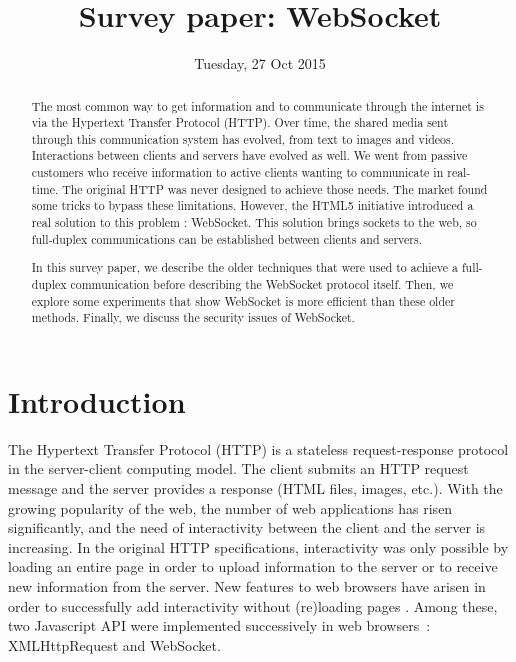 \documentclass[journal,compsoc]{IEEEtran}
\newcommand{\ws}{WebSocket}
\begin{document}
\author{}

\title{Survey paper: \ws}

\date{Tuesday, 27 Oct 2015}

\maketitle
\IEEEpeerreviewmaketitle



\begin{abstract}
The most common way to get information and to communicate through the internet is via the Hypertext Transfer Protocol (HTTP).
Over time, the shared media sent through this communication system has evolved, from text to images and videos.
Interactions between clients and servers have evolved as well.
We went from passive customers who receive information to active clients wanting to communicate in real-time.
The original HTTP was never designed to achieve those needs.
The market found some tricks to bypass these limitations.
However, the HTML5 initiative introduced a real solution to this problem : \ws{}.
This solution brings sockets to the web, so full-duplex communications can be established between clients and servers.

In this survey paper, we describe the older techniques that were used to achieve a full-duplex communication before describing the \ws{} protocol itself.
Then, we explore some experiments that show \ws{} is more efficient than these older methods.
Finally, we discuss the security issues of \ws{}.
\end{abstract}


\section{Introduction}

The Hypertext Transfer Protocol (HTTP) is a stateless request-response protocol in the server-client computing model.
The client submits an HTTP request message and the server provides a response (HTML files, images, etc.).
With the growing popularity of the web, the number of web applications has risen significantly, and the need of interactivity between the client and the server is increasing.
In the original HTTP specifications, interactivity was only possible by loading an entire page in order to upload information to the server or to receive new information from the server.
New features to web browsers have arisen in order to successfully add interactivity without (re)loading pages \cite{RealTimeMonitoringUsingAJAXAndWebSockets}.
Among these, two Javascript API were implemented successively in web \mbox{browsers :} XMLHttpRequest and \ws.
\end{document}
